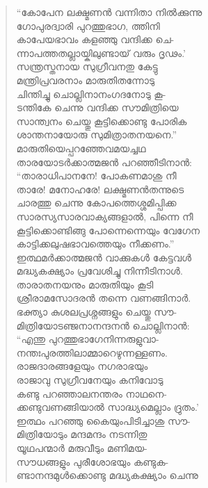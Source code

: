 \begin{verse}
“കോപേന ലക്ഷ്മണന്‍ വന്നിതാ നില്‍ക്കുന്നു\\
ഗോപുരദ്വാരി പുറത്തുഭാഗ, ത്തിനി\\
കാപേയഭാവം കളഞ്ഞു വന്ദിക്ക ചെ-\\
ന്നാപത്തതല്ലായ്കിലുണ്ടായ് വരും ദൃഢം.’\\
സന്ത്രസ്തനായ സുഗ്രീവനതു കേട്ടു\\
മന്ത്രിപ്രവരനാം മാരുതിതന്നോടു\\
ചിന്തിച്ചു ചൊല്ലിനാനംഗദനോടു കൂ-\\
ടന്തികേ ചെന്നു വന്ദിക്ക സൗമിത്രിയെ\\
സാന്ത്വനം ചെയ്തു കൂട്ടിക്കൊണ്ടു പോരിക\\
ശാന്തനായോരു സുമിത്രാതനയനെ.”\\
മാരുതിയെപ്പറഞ്ഞേവമയച്ചഥ\\
താരയോടര്‍ക്കാത്മജന്‍ പറഞ്ഞീടിനാന്‍:\\
“താരാധിപാനനേ! പോകണമാശു നീ\\
താരേ! മനോഹരേ! ലക്ഷ്മണന്‍തന്നുടെ\\
ചാരത്തു ചെന്നു കോപത്തെശ്ശമിപ്പിക്ക\\
സാരസ്യസാരവാക്യങ്ങളാല്‍, പിന്നെ നീ\\
കൂട്ടിക്കൊണ്ടിങ്ങു പോന്നെന്നെയും വേഗേന\\
കാട്ടിക്കലുഷഭാവത്തെയും നീക്കണം.”\\
ഇത്ഥമര്‍ക്കാത്മജന്‍ വാക്കുകള്‍ കേട്ടവള്‍\\
മദ്ധ്യകക്ഷ്യാം പ്രവേശിച്ചു നിന്നീടിനാള്‍.\\
താരാതനയനും മാരുതിയും കൂടി\\
ശ്രീരാമസോദരന്‍ തന്നെ വണങ്ങിനാര്‍.\\
ഭക്ത്യാ കുശലപ്രശ്നങ്ങളും ചെയ്തു സൗ-\\
മിത്രിയോടഞ്ജനാനന്ദനന്‍ ചൊല്ലിനാന്‍:\\
“എന്തു പുറത്തുഭാഗേനിന്നരുളുവാ-\\
നന്തഃപുരത്തിലാമ്മാറെഴുന്നള്ളണം.\\
രാജദാരങ്ങളേയും നഗരാഭയും\\
രാജാവു സുഗ്രീവനേയും കനിവോടു\\
കണ്ടു പറഞ്ഞാലനന്തരം നാഥനെ-\\
ക്കണ്ടുവണങ്ങിയാല്‍ സാദ്ധ്യമെല്ലാം ദ്രുതം.’\\
ഇത്ഥം പറഞ്ഞു കൈയുംപിടിച്ചാശു സൗ-\\
മിത്രിയോടും മന്ദമന്ദം നടന്നിതു\\
യൂഥപന്മാര്‍ മരുവീടും മണിമയ-\\
സൗധങ്ങളും പുരീശോഭയും കണ്ടുക-\\
ണ്ടാനന്ദമുള്‍ക്കൊണ്ടു മദ്ധ്യകക്ഷ്യാം ചെന്നു\\

\end{verse}
